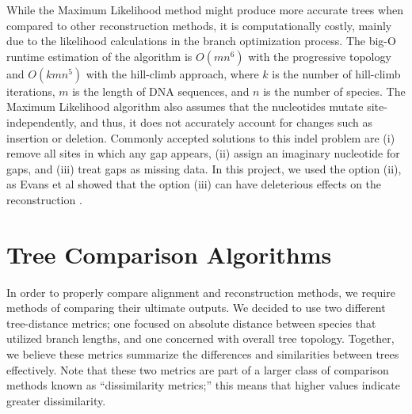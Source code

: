 \documentclass[10pt,twocolumn]{article}
\begin{document}
While the Maximum Likelihood method might produce more accurate trees when
compared to other reconstruction methods, it is computationally costly,
mainly due to the likelihood calculations in the branch optimization
process. The big-O runtime estimation of the algorithm is $O(mn^6)$ with the progressive topology and $O(kmn^5)$ with the hill-climb approach, where $k$ is the number of hill-climb iterations, $m$ is the length of DNA sequences, and $n$ is the number of species. The Maximum Likelihood algorithm also assumes that the nucleotides mutate site-independently, and thus, it does not accurately account for changes such as insertion or deletion. Commonly accepted solutions to this indel problem are (i) remove all sites in which any gap appears, (ii) assign an imaginary nucleotide for gaps, and (iii) treat gaps as missing data. In this project, we used the option (ii), as Evans et al showed that the option (iii) can have deleterious effects on the reconstruction \cite{evansphylogenetic}.

\section*{Tree Comparison Algorithms}
In order to properly compare alignment and reconstruction methods, we require methods of comparing their ultimate outputs. We decided to use two different tree-distance metrics; one focused on absolute distance between species that utilized branch lengths, and one concerned with overall tree topology. Together, we believe these metrics summarize the differences and similarities between trees effectively. Note that these two metrics are part of a larger class of comparison methods known as ``dissimilarity metrics;'' this means that higher values indicate greater dissimilarity.
\end{document}
